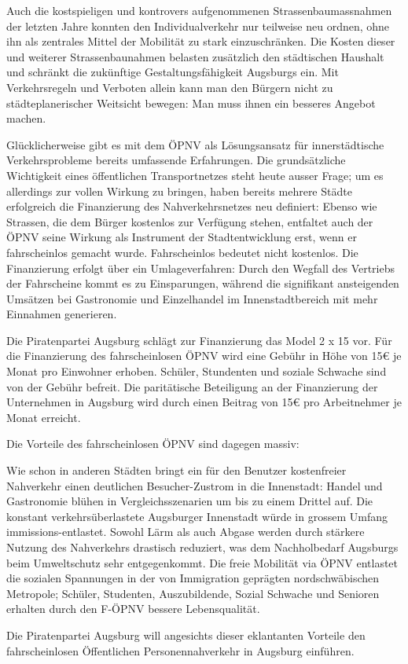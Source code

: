  Auch die kostspieligen und kontrovers aufgenommenen Strassenbaumassnahmen 
  der letzten Jahre konnten den Individualverkehr nur teilweise neu ordnen, 
  ohne ihn als zentrales Mittel der Mobilität zu stark einzuschränken. Die 
  Kosten dieser und weiterer Strassenbaunahmen belasten zusätzlich den 
  städtischen Haushalt und schränkt die zukünftige Gestaltungsfähigkeit 
  Augsburgs ein. Mit Verkehrsregeln und Verboten allein kann man den Bürgern 
  nicht zu städteplanerischer Weitsicht bewegen: Man muss ihnen ein besseres 
  Angebot machen.
  
  Glücklicherweise gibt es mit dem ÖPNV als Lösungsansatz für innerstädtische 
  Verkehrsprobleme bereits umfassende Erfahrungen. Die grundsätzliche 
  Wichtigkeit eines öffentlichen Transportnetzes steht heute ausser Frage; um 
  es allerdings zur vollen Wirkung zu bringen, haben bereits mehrere Städte 
  erfolgreich die Finanzierung des Nahverkehrsnetzes neu definiert: Ebenso wie 
  Strassen, die dem Bürger kostenlos zur Verfügung stehen, entfaltet auch der 
  ÖPNV seine Wirkung als Instrument der Stadtentwicklung erst, wenn er 
  fahrscheinlos gemacht wurde. Fahrscheinlos bedeutet nicht kostenlos. Die 
  Finanzierung erfolgt über ein Umlageverfahren: Durch den Wegfall des 
  Vertriebs der Fahrscheine kommt es zu Einsparungen, während die signifikant 
  ansteigenden Umsätzen bei Gastronomie und Einzelhandel im Innenstadtbereich 
  mit mehr Einnahmen generieren.
  
  Die Piratenpartei Augsburg schlägt zur Finanzierung das Model 2 x 15 vor. 
  Für die Finanzierung des fahrscheinlosen ÖPNV wird eine Gebühr in Höhe von 
  15€ je Monat pro Einwohner erhoben. Schüler, Stundenten und soziale Schwache 
  sind von der Gebühr befreit. Die paritätische Beteiligung an der 
  Finanzierung der Unternehmen in Augsburg wird durch einen Beitrag von 15€ 
  pro Arbeitnehmer je Monat erreicht.
  
  Die Vorteile des fahrscheinlosen ÖPNV sind dagegen massiv:
  
  Wie schon in anderen Städten bringt ein für den Benutzer kostenfreier 
  Nahverkehr einen deutlichen Besucher-Zustrom in die Innenstadt: Handel und 
  Gastronomie blühen in Vergleichsszenarien um bis zu einem Drittel auf. Die 
  konstant verkehrsüberlastete Augsburger Innenstadt würde in grossem Umfang 
  immissions-entlastet. Sowohl Lärm als auch Abgase werden durch stärkere 
  Nutzung des Nahverkehrs drastisch reduziert, was dem Nachholbedarf Augsburgs 
  beim Umweltschutz sehr entgegenkommt. Die freie Mobilität via ÖPNV entlastet 
  die sozialen Spannungen in der von Immigration geprägten nordschwäbischen 
  Metropole; Schüler, Studenten, Auszubildende, Sozial Schwache und Senioren 
  erhalten durch den F-ÖPNV bessere Lebensqualität.
  
  Die Piratenpartei Augsburg will angesichts dieser eklantanten Vorteile den 
  fahrscheinlosen Öffentlichen Personennahverkehr in Augsburg einführen.